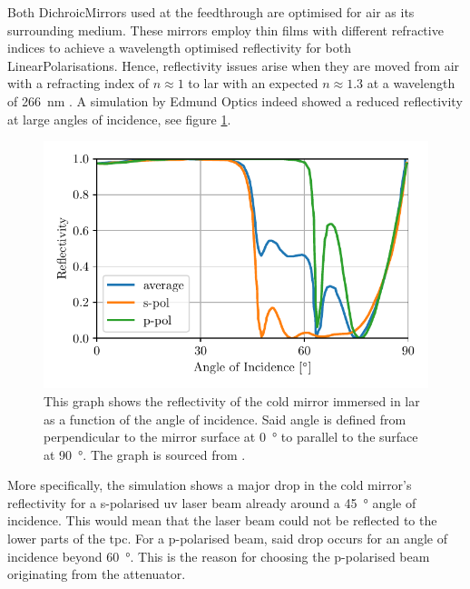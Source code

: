 Both \glspl{DichroicMirror} used at the feedthrough are optimised for air as its surrounding medium. These mirrors employ thin films with different refractive indices to achieve a wavelength optimised reflectivity for both \glspl{LinearPolarisation}. Hence, reflectivity issues arise when they are moved from air with a refracting index of $n \approx \num{1}$ to \gls{lar} with an expected $n \approx \num{1.3}$ at a wavelength of \SI{266}{\nano\metre} \cite{LArRefractiveIndex,LArLaserPhDMatthias}. A simulation by Edmund Optics indeed showed a reduced reflectivity at large angles of incidence, see figure \ref{fig:MirrorReflectivity}.
\begin{figure}[htbp]
    \centering
    \includegraphics[width=1.0\textwidth]{images/MicroBooNE/LCSReflectionAngles.pdf}     
    \caption[Cold Mirror Reflectivity]{This graph shows the reflectivity of the cold mirror immersed in \gls{lar} as a function of the angle of incidence. Said angle is defined from perpendicular to the mirror surface at \SI{0}{\degree} to parallel to the surface at \SI{90}{\degree}. The graph is sourced from \cite{LArLaserPhDMatthias}.}
    \label{fig:MirrorReflectivity}
\end{figure}
More specifically, the simulation shows a major drop in the cold mirror's reflectivity for a s-polarised \gls{uv} laser beam already around a \SI{45}{\degree} angle of incidence. This would mean that the laser beam could not be reflected to the lower parts of the \gls{tpc}. For a p-polarised beam, said drop occurs for an angle of incidence beyond \SI{60}{\degree}. This is the reason for choosing the p-polarised beam originating from the attenuator.

